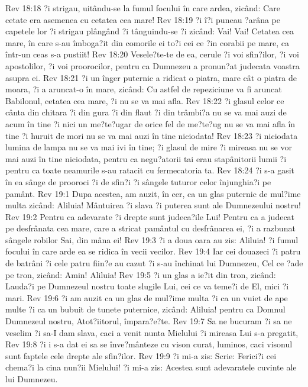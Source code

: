Rev 18:18  ?i strigau, uitându-se la fumul focului în care ardea, zicând: Care cetate era asemenea cu cetatea cea mare!
Rev 18:19  ?i î?i puneau ?arâna pe capetele lor ?i strigau plângând ?i tânguindu-se ?i zicând: Vai! Vai! Cetatea cea mare, în care s-au îmboga?it din comorile ei to?i cei ce ?in corabii pe mare, ca într-un ceas s-a pustiit!
Rev 18:20  Vesele?te-te de ea, cerule ?i voi sfin?ilor, ?i voi apostolilor, ?i voi proorocilor, pentru ca Dumnezeu a pronun?at judecata voastra asupra ei.
Rev 18:21  ?i un înger puternic a ridicat o piatra, mare cât o piatra de moara, ?i a aruncat-o în mare, zicând: Cu astfel de repeziciune va fi aruncat Babilonul, cetatea cea mare, ?i nu se va mai afla.
Rev 18:22  ?i glasul celor ce cânta din chitara ?i din gura ?i din flaut ?i din trâmbi?a nu se va mai auzi de acum în tine ?i nici un me?te?ugar de orice fel de me?te?ug nu se va mai afla în tine ?i huruit de mori nu se va mai auzi în tine niciodata!
Rev 18:23  ?i niciodata lumina de lampa nu se va mai ivi în tine; ?i glasul de mire ?i mireasa nu se vor mai auzi în tine niciodata, pentru ca negu?atorii tai erau stapânitorii lumii ?i pentru ca toate neamurile s-au ratacit cu fermecatoria ta.
Rev 18:24  ?i s-a gasit în ea sânge de prooroci ?i de sfin?i ?i sângele tuturor celor înjunghia?i pe pamânt.
Rev 19:1  Dupa acestea, am auzit, în cer, ca un glas puternic de mul?ime multa zicând: Aliluia! Mântuirea ?i slava ?i puterea sunt ale Dumnezeului nostru!
Rev 19:2  Pentru ca adevarate ?i drepte sunt judeca?ile Lui! Pentru ca a judecat pe desfrânata cea mare, care a stricat pamântul cu desfrânarea ei, ?i a razbunat sângele robilor Sai, din mâna ei!
Rev 19:3  ?i a doua oara au zis: Aliluia! ?i fumul focului în care arde ea se ridica în vecii vecilor.
Rev 19:4  Iar cei douazeci ?i patru de batrâni ?i cele patru fiin?e au cazut ?i s-au închinat lui Dumnezeu, Cel ce ?ade pe tron, zicând: Amin! Aliluia!
Rev 19:5  ?i un glas a ie?it din tron, zicând: Lauda?i pe Dumnezeul nostru toate slugile Lui, cei ce va teme?i de El, mici ?i mari.
Rev 19:6  ?i am auzit ca un glas de mul?ime multa ?i ca un vuiet de ape multe ?i ca un bubuit de tunete puternice, zicând: Aliluia! pentru ca Domnul Dumnezeul nostru, Atot?iitorul, împara?e?te.
Rev 19:7  Sa ne bucuram ?i sa ne veselim ?i sa-I dam slava, caci a venit nunta Mielului ?i mireasa Lui s-a pregatit,
Rev 19:8  ?i i s-a dat ei sa se înve?mânteze cu vison curat, luminos, caci visonul sunt faptele cele drepte ale sfin?ilor.
Rev 19:9  ?i mi-a zis: Scrie: Ferici?i cei chema?i la cina nun?ii Mielului! ?i mi-a zis: Acestea sunt adevaratele cuvinte ale lui Dumnezeu.
